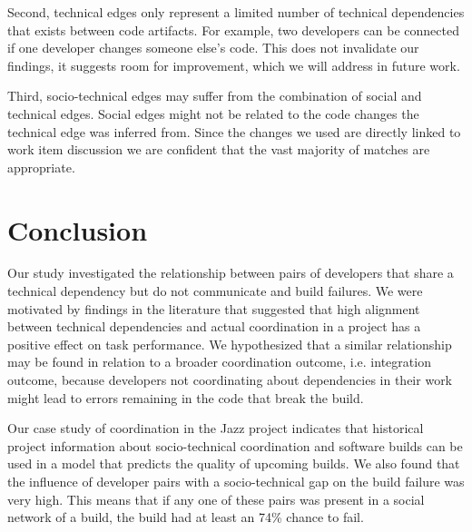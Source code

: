 \documentclass[conference]{IEEEtran}
\begin{document}
Second, technical edges only represent a limited number of technical dependencies that exists between code artifacts. 
For example, two developers can be connected if one developer changes someone else's code. 
This does not invalidate our findings, it suggests room for improvement, which we will address in future work.

Third, socio-technical edges may suffer from the combination of social and technical edges. 
Social edges might not be related to the code changes the technical edge was inferred from.
Since the changes we used are directly linked to work item discussion we are confident that the vast majority of matches are appropriate.


\section{Conclusion}
Our study investigated the relationship between pairs of developers that share
a technical dependency but do not communicate and build failures. We were
motivated by findings in the literature that suggested that high alignment between technical dependencies and actual coordination in a project has a positive effect on task
performance.
We hypothesized that a similar relationship may be found in relation to a broader
coordination outcome, i.e. integration outcome, because developers not
coordinating about dependencies in their work might lead to errors remaining in
the code that break the build.

Our case study of coordination in the Jazz project indicates that 
historical project information about socio-technical coordination and software
builds can be used in a model that predicts the quality of upcoming builds. We also found
that the influence of developer pairs with a socio-technical gap on the build
failure was very high. This means that if any one of these pairs was present in a
social network of a build, the build had at least an 74\% chance to fail.









%
%
\end{document}
